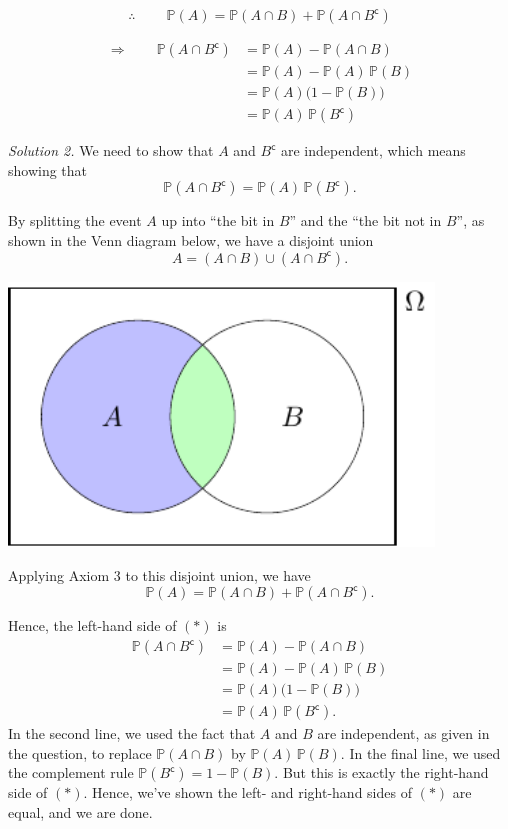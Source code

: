 \documentclass[
  a4paper,
]{book}
\theoremstyle{definition}
\theoremstyle{definition}
\theoremstyle{definition}
\theoremstyle{definition}
\theoremstyle{remark}
\begin{document}
\[ \therefore \ \qquad \mathbb P(A) = \mathbb P(A \cap B) + \mathbb P(A \cap B^\mathsf{c})  \]

\begin{align*}
\Rightarrow \qquad \mathbb P(A \cap B^\mathsf{c})
&= \mathbb P(A) - \mathbb P(A \cap B) \\
&= \mathbb P(A) - \mathbb P(A)\,\mathbb P(B) \\
&= \mathbb P(A) \big(1 - \mathbb P(B)\big) \\
&= \mathbb P(A) \, \mathbb P(B^\mathsf{c}) 
\end{align*}

\emph{Solution 2.}
We need to show that \(A\) and \(B^\mathsf{c}\) are independent, which means showing that
\[ \mathbb P(A \cap B^\mathsf{c}) = \mathbb P(A) \, \mathbb P(B^\mathsf{c}) . \tag{$*$} \]

By splitting the event \(A\) up into ``the bit in \(B\)'' and the ``the bit not in \(B\)'', as shown in the Venn diagram below, we have a disjoint union
\[ A = (A \cap B) \cup (A \cap B^\mathsf{c}) . \]

\begin{center}\includegraphics[width=320pt]{math1710_files/figure-latex/writing-pic-1-1} \end{center}

Applying Axiom 3 to this disjoint union, we have
\[ \mathbb P(A) = \mathbb P(A \cap B) + \mathbb P(A \cap B^\mathsf{c}) . \]

Hence, the left-hand side of \((*)\) is
\begin{align*}
\mathbb P(A \cap B^\mathsf{c})
&= \mathbb P(A) - \mathbb P(A \cap B) \\
&= \mathbb P(A) - \mathbb P(A)\,\mathbb P(B) \\
&= \mathbb P(A) \big(1 - \mathbb P(B)\big) \\
&= \mathbb P(A) \, \mathbb P(B^\mathsf{c}) .
\end{align*}
In the second line, we used the fact that \(A\) and \(B\) are independent, as given in the question, to replace \(\mathbb P(A \cap B)\) by \(\mathbb P(A)\,\mathbb P(B)\). In the final line, we used the complement rule \(\mathbb P(B^\mathsf{c}) = 1 - \mathbb P(B)\). But this is exactly the right-hand side of \((*)\).
Hence, we've shown the left- and right-hand sides of \((*)\) are equal, and we are done.
\end{document}
